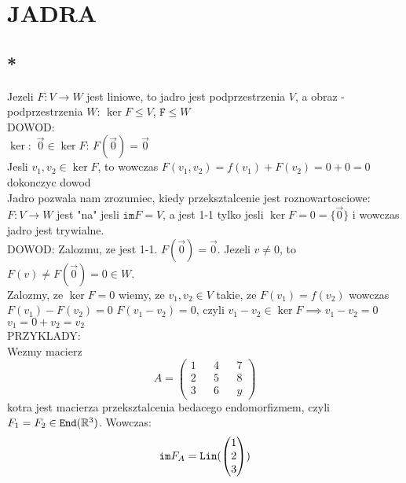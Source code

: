 \documentclass{article}
\begin{document}
\ttfamily
\section*{JADRA}
\subsection*{*}
Jezeli $F: V\to W$ jest liniowe, to jadro jest podprzestrzenia $V$, a obraz - podprzestrzenia $W$: $\ker F\leq V$, $\texttt{F}\leq W$\\
DOWOD:\\
$\ker:$ $\overset{\to}{0}\in \ker F$: $F(\overset{\to}{0})=\overset{\to}{0}$\\
Jesli $v_1, v_2\in \ker F$, to wowczas $F(v_1, v_2)=f(v_1)+F(v_2)=0+0=0$\\
dokonczyc dowod\\
Jadro pozwala nam zrozumiec, kiedy przeksztalcenie jest roznowartosciowe: $F: V\to W$ jest "na" jesli $\texttt{im}F=V$, a jest 1-1 tylko jesli $\ker F= 0 =\{\overset{\to}{0}\}$ i wowczas jadro jest trywialne.\\
DOWOD: Zalozmu, ze jest 1-1. $F(\overset{\to}{0})=\overset{\to}{0}$. Jezeli $v\neq 0$, to $F(v)\neq F(\overset{\to}{0})=0\in W$. \\
Zalozmy, ze $\ker F= 0$ wiemy, ze $v_1,v_2\in V$ takie, ze $F(v_1)=f(v_2)$ wowczas $F(v_1)-F(v_2)=0$ $F(v_1-v_2)=0$, czyli $v_1-v_2\in \ker F\implies v_1-v_2=0$ $v_1=0+v_2=v_2$\\
PRZYKLADY:\\
Wezmy macierz
$$A=\begin{pmatrix}1 &&4&&7\\2&&5&&8\\3&&6&&y\end{pmatrix}$$
kotra jest macierza przeksztalcenia bedacego endomorfizmem, czyli $F_1=F_2\in\texttt{End}(\mathbb{R}^3)$. Wowczas:
$$\texttt{im}F_A=\texttt{Lin}(\begin{pmatrix}1\\2\\3\end{pmatrix})$$
\end{document}
